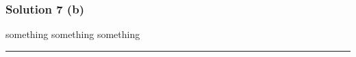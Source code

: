 \documentclass{article}
\begin{document}
\subsubsection*{Solution 7 (b)}
\parbox{\textwidth}{
something something something
}
\noindent\rule{\textwidth}{0.4pt}\\

\newpage

\begin{comment}
\subsection*{Solution 2}
\noindent\rule{\textwidth}{0.4pt}\\
\subsubsection*{Solution 2 (a)}
\subsubsection*{Step 1: Define Euclidean distance ($\ell_2$)}
\parbox{\textwidth}{

$$\ell_2 = \|p - q\|_2 = \sqrt{\sum_{i=1}^{n} (p_i - q_i)^2}$$

}

\subsubsection*{Step 2: Compute $\ell_2$}
\parbox{\textwidth}{
Let $p=1$ and $q=10$
$$
\begin{aligned}
\ell_2 &= \sqrt{\sum_{i=1}^{n} (p_i - q_i)^2}\\
\ell_2 &= \sqrt{\sum_{i=1}^{1} (1 - 10)^2}\\
\ell_2 &= \sqrt{(- 9)^2}\\
\ell_2 &= 9
\end{aligned}
$$
}
\subsubsection*{\normalfont}{$\therefore$ $\ell_{2} = 9$}

\noindent\rule{\textwidth}{0.4pt}\\

\subsubsection*{Solution 2 (b)}

\end{comment}
\end{document}
